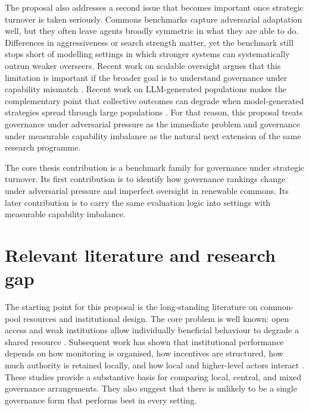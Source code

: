 \documentclass[10pt]{article}
\begin{document}
The proposal also addresses a second issue that becomes important once strategic turnover is taken seriously. Commons benchmarks capture adversarial adaptation well, but they often leave agents broadly symmetric in what they are able to do. Differences in aggressiveness or search strength matter, yet the benchmark still stops short of modelling settings in which stronger systems can systematically outrun weaker overseers. Recent work on scalable oversight argues that this limitation is important if the broader goal is to understand governance under capability mismatch \citep{bowman2022, engels2025}. Recent work on LLM-generated populations makes the complementary point that collective outcomes can degrade when model-generated strategies spread through large populations \citep{willis2025, willis2026}. For that reason, this proposal treats governance under adversarial pressure as the immediate problem and governance under measurable capability imbalance as the natural next extension of the same research programme.

The core thesis contribution is a benchmark family for governance under strategic turnover. Its first contribution is to identify how governance rankings change under adversarial pressure and imperfect oversight in renewable commons. Its later contribution is to carry the same evaluation logic into settings with measurable capability imbalance.

\section{Relevant literature and research gap}

The starting point for this proposal is the long-standing literature on common-pool resources and institutional design. The core problem is well known: open access and weak institutions allow individually beneficial behaviour to degrade a shared resource \citep{gordon1954, scott1955, ostrom1990}. Subsequent work has shown that institutional performance depends on how monitoring is organised, how incentives are structured, how much authority is retained locally, and how local and higher-level actors interact \citep{hilborn2005, gutierrez2011, ostrom1993, ostrom1994, villamayor2020, nagendra2012}. These studies provide a substantive basis for comparing local, central, and mixed governance arrangements. They also suggest that there is unlikely to be a single governance form that performs best in every setting.
\end{document}

